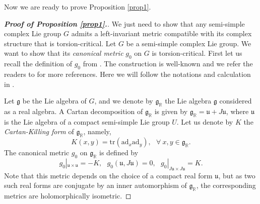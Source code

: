 \documentclass{amsart}
\begin{document}
{Now we are ready to prove Proposition \ref{prop1}.

\begin{proof}[{\bf Proof of Proposition \ref{prop1}.}]
We just need to show that any semi-simple complex Lie group $G$ admits a left-invariant metric compatible with its complex structure that is torsion-critical. Let $G$ be a  semi-simple complex Lie group. We want to show that its {\em canonical metric} $g_0$ on $G$ is torsion-critical. First let us  recall the definition of $g_0$ from \cite{PodestaZ}. The construction is well-known and we refer the readers to \cite{Gordon, Helgason, Lafuente} for more references. Here we will follow the notations and calculation in \cite{PodestaZ}.

Let ${\mathfrak g}$ be the Lie algebra of $G$, and we  denote by $\mathfrak g_{\mathbb R}$ the Lie algebra $\mathfrak g$ considered as a real algebra. A Cartan decomposition of  $\mathfrak g_{\mathbb R}$ is given by ${\mathfrak g_{\mathbb R}} = {\mathfrak u} + J{\mathfrak u}$, where ${\mathfrak u}$ is the Lie algebra of a compact semi-simple Lie group $U$. Let us denote by $K$ the {\em Cartan-Killing form} of ${\mathfrak g_{\mathbb R}}$, namely, 
$$ K(x,y) = \mbox{tr}(\mbox{ad}_x\mbox{ad}_y), \ \ \ \forall \ x,y \in {\mathfrak g_{\mathbb R}}. $$
The canonical metric $g_0$ on ${\mathfrak g_{\mathbb R}}$ is defined by
$$g_0|_{{\mathfrak u} \times {\mathfrak u}} = -K,\ \ \ g_0({\mathfrak u},J{\mathfrak u})=0,\ \ \ g_0|_{J{\mathfrak u} \times J{\mathfrak u}} = K.$$
Note that this metric depends on the choice of a compact real form ${\mathfrak u}$, but as two such real forms are conjugate by an inner automorphism of $\mathfrak g_{\mathbb R}$, the corresponding metrics are holomorphically isometric. 


\end{proof}}
\end{document}
